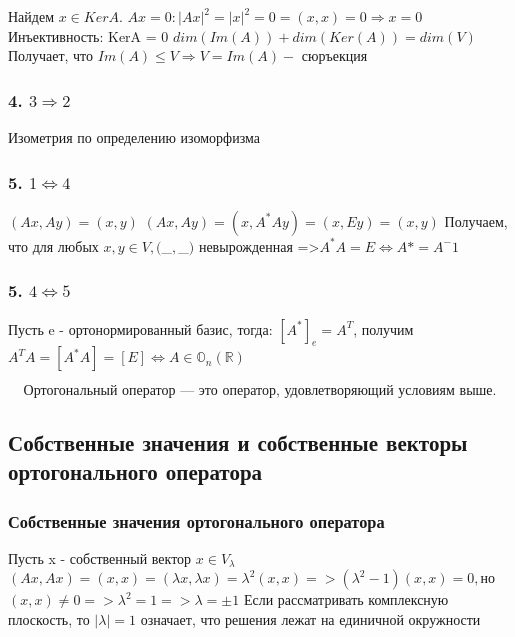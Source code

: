 \documentclass[12pt]{article}
\begin{document}
Найдем $x \in KerA$.\newline
$Ax = 0 : |Ax|^2 = |x|^2 = 0 = (x,x) =0 \Rightarrow x = 0$ \newline
Инъективность: KerA = {0} \newline
$dim(Im(A)) + dim(Ker(A)) = dim(V)$ \newline
Получает, что $Im(A) \leq V \Rightarrow V = Im(A) -$ сюръекция

\subsubsection*{4. $ 3 \Rightarrow 2 $}
Изометрия по определению изоморфизма

\subsubsection*{5. $ 1 \Longleftrightarrow 4 $}
$(Ax, Ay) = (x,y)$\newline
$(Ax, Ay) = (x,A^*Ay) = (x, Ey) = (x,y)$\newline
Получаем, что для любых $x,y \in V, ($_$,$_$)$ невырожденная =>$ A^*A = E \Longleftrightarrow A* = A^-1$

\subsubsection*{5. $ 4 \Longleftrightarrow 5 $}
Пусть e - ортонормированный базис, тогда:\newline
$[A^*]_e = A^T$, получим $A^TA = [A^*A] = [E] \Longleftrightarrow A \in \mathbb{O}_n(\mathbb{R})$

$$
\boxed{
\text{Ортогональный оператор — это оператор, удовлетворяющий условиям выше.}
}
$$
\subsection*{Собственные значения и собственные векторы ортогонального оператора}
\subsubsection*{Собственные значения ортогонального оператора}
Пусть x - собственный вектор $x \in V_\lambda$ \newline
$(Ax, Ax) = (x,x) = (\lambda x, \lambda x) = \lambda^2(x,x) => (\lambda^2 - 1)(x,x) = 0,$\newline но $(x,x) \ne 0 => \lambda^2 = 1 => \lambda = \pm 1$\newline
Если рассматривать комплексную плоскость, то $|\lambda| = 1$ означает, что решения лежат на единичной окружности
\end{document}

